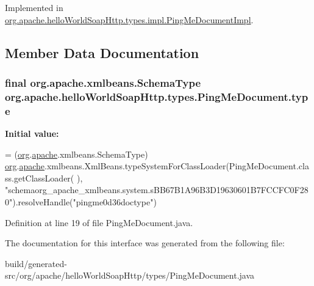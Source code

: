 Implemented in \hyperlink{classorg_1_1apache_1_1hello_world_soap_http_1_1types_1_1impl_1_1_ping_me_document_impl_a985877005d06f88e67ff7bb6aefa37d4}{org.\+apache.\+hello\+World\+Soap\+Http.\+types.\+impl.\+Ping\+Me\+Document\+Impl}.



\subsection{Member Data Documentation}
\hypertarget{interfaceorg_1_1apache_1_1hello_world_soap_http_1_1types_1_1_ping_me_document_a264f94a3e12d58ea894e180810ba2d8b}{}
\subsubsection[{type}]{\setlength{\rightskip}{0pt plus 5cm}final org.\+apache.\+xmlbeans.\+Schema\+Type org.\+apache.\+hello\+World\+Soap\+Http.\+types.\+Ping\+Me\+Document.\+type\hspace{0.3cm}{\ttfamily [static]}}\label{interfaceorg_1_1apache_1_1hello_world_soap_http_1_1types_1_1_ping_me_document_a264f94a3e12d58ea894e180810ba2d8b}
{\bfseries Initial value\+:}
\begin{DoxyCode}
= (\hyperlink{namespaceorg}{org}.\hyperlink{namespaceorg_1_1apache}{apache}.xmlbeans.SchemaType)
        \hyperlink{namespaceorg}{org}.\hyperlink{namespaceorg_1_1apache}{apache}.xmlbeans.XmlBeans.typeSystemForClassLoader(PingMeDocument.class.getClassLoader(
      ), \textcolor{stringliteral}{"schemaorg\_apache\_xmlbeans.system.sBB67B1A96B3D19630601B7FCCFC0F280"}).resolveHandle(\textcolor{stringliteral}{"pingme0d36doctype"})
\end{DoxyCode}


Definition at line 19 of file Ping\+Me\+Document.\+java.



The documentation for this interface was generated from the following file\+:\begin{DoxyCompactItemize}
\item 
build/generated-\/src/org/apache/hello\+World\+Soap\+Http/types/Ping\+Me\+Document.\+java\end{DoxyCompactItemize}
